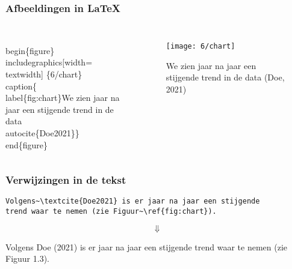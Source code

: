 \documentclass[aspectratio=169]{beamer}
\begin{document}
\begin{frame}
  \frametitle{Afbeeldingen in {\LaTeX}}

  \begin{columns}[c]
 
 \begin{semiverbatim}
 \alert<1>{\\begin\{figure\}}
 \alert<2>{\\includegraphics[width=\\textwidth]
   \{6/chart\}}
 \alert<3>{\\caption\{\alert<4>{\\label\{fig:chart\}}We zien jaar
   na jaar een stijgende trend in
   de data \alert<5>{\\autocite\{Doe2021\}}\}}
 \alert<1>{\\end\{figure\}}
 \end{semiverbatim}
 
    \begin{figure}
      \texttt{[image: 6/chart]}
      \caption{\label{fig:chart}We zien jaar na jaar een stijgende trend in de data (Doe, 2021)}
    \end{figure}

  \end{columns}

\end{frame}

\begin{frame}[fragile]
  \frametitle{Verwijzingen in de tekst}

\begin{verbatim}
Volgens~\textcite{Doe2021} is er jaar na jaar een stijgende
trend waar te nemen (zie Figuur~\ref{fig:chart}).
\end{verbatim}

\[\Downarrow\]

\bigskip

Volgens Doe (2021) is er jaar na jaar een stijgende trend waar te nemen (zie Figuur 1.3).

\end{frame}

\end{document}
